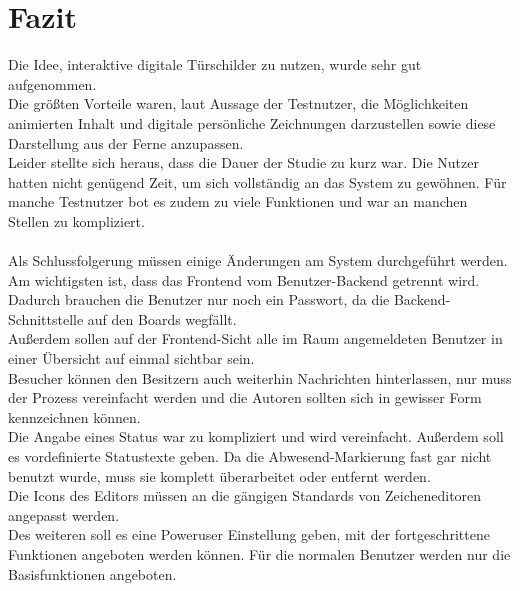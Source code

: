 \chapter{Fazit}\label{Fazit}
Die Idee, interaktive digitale Türschilder zu nutzen, wurde sehr gut aufgenommen.
\\
Die größten Vorteile waren, laut Aussage der Testnutzer, die Möglichkeiten animierten Inhalt und digitale persönliche Zeichnungen darzustellen sowie diese Darstellung aus der Ferne anzupassen.
\\
Leider stellte sich heraus, dass die Dauer der Studie zu kurz war.
Die Nutzer hatten nicht genügend Zeit, um sich vollständig an das System zu gewöhnen.
Für manche Testnutzer bot es zudem zu viele Funktionen und war an manchen Stellen zu kompliziert.
\\
\\
Als Schlussfolgerung müssen einige Änderungen am System durchgeführt werden.
Am wichtigsten ist, dass das Frontend vom Benutzer-Backend getrennt wird.
Dadurch brauchen die Benutzer nur noch ein Passwort, da die Backend-Schnittstelle auf den Boards wegfällt.
\\
Außerdem sollen auf der Frontend-Sicht alle im Raum angemeldeten Benutzer in einer Übersicht auf einmal sichtbar sein.
\\
Besucher können den Besitzern auch weiterhin Nachrichten hinterlassen, nur muss der Prozess vereinfacht werden und die Autoren sollten sich in gewisser Form kennzeichnen können.
\\
Die Angabe eines Status war zu kompliziert und wird vereinfacht.
Außerdem soll es vordefinierte Statustexte geben.
Da die Abwesend-Markierung fast gar nicht benutzt wurde, muss sie komplett überarbeitet oder entfernt werden.
\\
Die Icons des Editors müssen an die gängigen Standards von Zeicheneditoren angepasst werden.
\\
Des weiteren soll es eine Poweruser Einstellung geben, mit der fortgeschrittene Funktionen angeboten werden können. Für die normalen Benutzer werden nur die Basisfunktionen angeboten.
